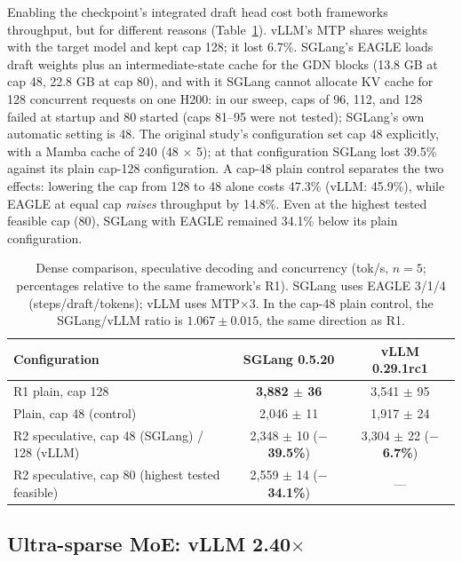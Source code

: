 \documentclass[11pt]{article}
\newcommand{\tps}{tok/s\xspace}
\begin{document}
Enabling the checkpoint's integrated draft head cost both frameworks throughput, but for different reasons (Table~\ref{tab:dense-r2}). vLLM's MTP shares weights with the target model and kept cap 128; it lost 6.7\%. SGLang's EAGLE loads draft weights plus an intermediate-state cache for the GDN blocks (13.8 GB at cap 48, 22.8 GB at cap 80), and with it SGLang cannot allocate KV cache for 128 concurrent requests on one H200: in our sweep, caps of 96, 112, and 128 failed at startup and 80 started (caps 81--95 were not tested); SGLang's own automatic setting is 48. The original study's configuration set cap 48 explicitly, with a Mamba cache of 240 (48 $\times$ 5); at that configuration SGLang lost 39.5\% against its plain cap-128 configuration. A cap-48 plain control separates the two effects: lowering the cap from 128 to 48 alone costs 47.3\% (vLLM: 45.9\%), while EAGLE at equal cap \emph{raises} throughput by 14.8\%. Even at the highest tested feasible cap (80), SGLang with EAGLE remained 34.1\% below its plain configuration.

\begin{table}[t]
\centering
\small
\begin{tabular}{lcc}
\toprule
\textbf{Configuration} & \textbf{SGLang 0.5.20} & \textbf{vLLM 0.29.1rc1} \\
\midrule
R1 plain, cap 128 & \textbf{3,882 $\pm$ 36} & 3,541 $\pm$ 95 \\
Plain, cap 48 (control) & 2,046 $\pm$ 11 & 1,917 $\pm$ 24 \\
R2 speculative, cap 48 (SGLang) / 128 (vLLM) & 2,348 $\pm$ 10 (\textbf{$-$39.5\%}) & 3,304 $\pm$ 22 (\textbf{$-$6.7\%}) \\
R2 speculative, cap 80 (highest tested feasible) & 2,559 $\pm$ 14 (\textbf{$-$34.1\%}) & --- \\
\bottomrule
\end{tabular}
\caption{Dense comparison, speculative decoding and concurrency (\tps, $n=5$; percentages relative to the same framework's R1). SGLang uses EAGLE 3/1/4 (steps/draft/tokens); vLLM uses MTP$\times$3. In the cap-48 plain control, the SGLang/vLLM ratio is $1.067 \pm 0.015$, the same direction as R1.}
\label{tab:dense-r2}
\end{table}

\subsection{\texorpdfstring{Ultra-sparse MoE: vLLM 2.40$\times$}{Ultra-sparse MoE: vLLM 2.40x}}
\label{sec:moe}
\end{document}
